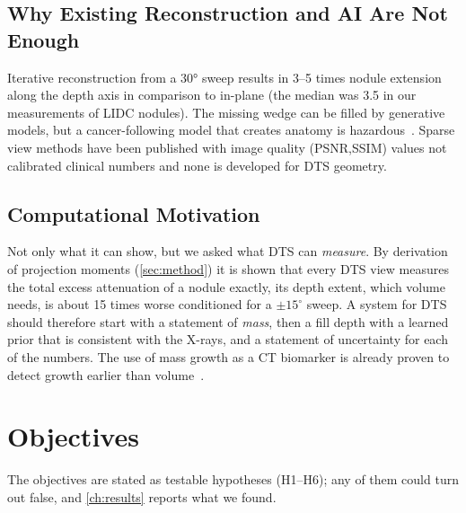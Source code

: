 \subsection{Why Existing Reconstruction and AI Are Not Enough}
Iterative reconstruction from a \ang{30} sweep results in 3--5 times nodule extension along the depth axis in comparison to in-plane (the median was 3.5 in our measurements of LIDC nodules). The missing wedge can be filled by generative models, but a cancer-following model that creates anatomy is hazardous~\cite{bhadra2021,zhang2025pail}. Sparse view methods have been published with image quality (PSNR,SSIM) values not calibrated clinical numbers and none is developed for DTS geometry.

\subsection{Computational Motivation}
Not only what it can show, but we asked what DTS can \emph{measure}. By derivation of projection moments (\cref{sec:method}) it is shown that every DTS view measures the total excess attenuation of a nodule exactly, its depth extent, which volume needs, is about 15 times worse conditioned for a $\pm15^\circ$ sweep. A system for DTS should therefore start with a statement of \emph{mass}, then a fill depth with a learned prior that is consistent with the X-rays, and a statement of uncertainty for each of the numbers. The use of mass growth as a CT biomarker is already proven to detect growth earlier than volume~\cite{dehoop2010}.

\section{Objectives}

The objectives are stated as testable hypotheses (H1--H6); any of them could turn out false, and \cref{ch:results} reports what we found.

